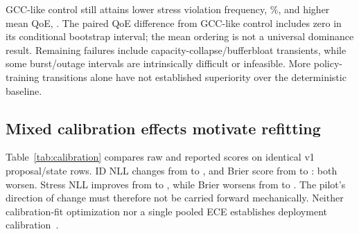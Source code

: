 \documentclass[10pt]{article}
\providecommand{\evidencepath}{generated-scaleup}
\begin{document}
GCC-like control still attains lower stress violation frequency, \EvidenceOODGCCUnsafePct\%, and higher mean QoE, \EvidenceOODGCCQoE{}. The paired QoE difference from GCC-like control includes zero in its conditional bootstrap interval; the mean ordering is not a universal dominance result. Remaining failures include capacity-collapse/bufferbloat transients, while some burst/outage intervals are intrinsically difficult or infeasible. More policy-training transitions alone have not established superiority over the deterministic baseline.

\begin{table}[t]
\centering\resizebox{\textwidth}{!}{}
\caption{Completed v1 scale-up: means and conditional 95\% model-seed bootstrap intervals. Unsafe/fallback are interval percentages, not packet percentages. OOD denotes the seven families held out of v1 training.}\label{tab:comparison}
\end{table}

\subsection{Mixed calibration effects motivate refitting}
Table~\ref{tab:calibration} compares raw and reported scores on identical v1 proposal/state rows. ID NLL changes from \EvidenceIDRawNLL{} to \EvidenceIDCalibratedNLL{}, and Brier score from \EvidenceIDRawBRIER{} to \EvidenceIDCalibratedBRIER{}: both worsen. Stress NLL improves from \EvidenceOODRawNLL{} to \EvidenceOODCalibratedNLL{}, while Brier worsens from \EvidenceOODRawBRIER{} to \EvidenceOODCalibratedBRIER{}. The pilot's direction of change must therefore not be carried forward mechanically. Neither calibration-fit optimization nor a single pooled ECE establishes deployment calibration~\cite{ovadia2019shift}.

\begin{table}[t]
\centering
\caption{V1 pooled same-state raw/reported confidence. Lower is better. These pooled scores are distinct from means of per-episode scores.}\label{tab:calibration}
\end{table}
\begin{table}[t]
\centering\resizebox{\textwidth}{!}{}
\caption{Completed v1 inference-time ablations. Each method visits different states, so their calibration metrics alone cannot isolate recalibration effects. Unsafe/fallback are percentages.}\label{tab:v1ablations}
\end{table}
\end{document}
